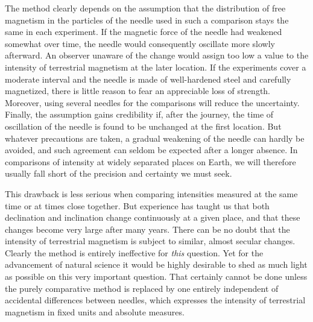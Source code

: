 The method clearly depends on the assumption that the distribution of free magnetism in the particles of the needle used in such a comparison stays the same in each experiment. If the magnetic force of the needle had weakened somewhat over time, the needle would consequently oscillate more slowly afterward. An observer unaware of the change would assign too low a value to the intensity of terrestrial magnetism at the later location. If the experiments cover a moderate interval and the needle is made of well-hardened steel and carefully magnetized, there is little reason to fear an appreciable loss of strength. Moreover, using several needles for the comparisons will reduce the uncertainty. Finally, the assumption gains credibility if, after the journey, the time of oscillation of the needle is found to be unchanged at the first location. But whatever precautions are taken, a gradual weakening of the needle can hardly be avoided, and such agreement can seldom be expected after a longer absence. In comparisons of intensity at widely separated places on Earth, we will therefore usually fall short of the precision and certainty we must seek.

This drawback is less serious when comparing intensities measured at the same time or at times close together. But experience has taught us that both declination and inclination change continuously at a given place, and that these changes become very large after many years. There can be no doubt that the intensity of terrestrial magnetism is subject to similar, almost secular changes. Clearly the method is entirely ineffective for \textit{this} question. Yet for the advancement of natural science it would be highly desirable to shed as much light as possible on this very important question. That certainly cannot be done unless the purely comparative method is replaced by one entirely independent of accidental differences between needles, which expresses the intensity of terrestrial magnetism in fixed units and absolute measures.

